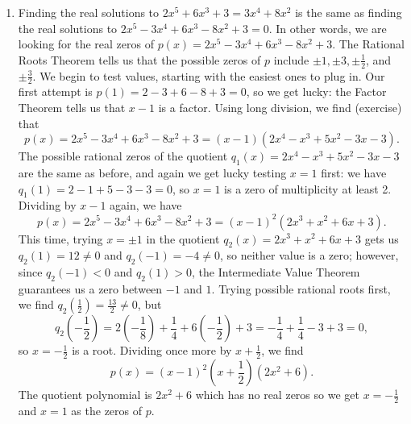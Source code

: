 {
\begin{enumerate}

\item  Finding the real solutions to $2x^5+6x^3+3 = 3x^4+8x^2$ is the same as finding the real solutions to $2x^5-3x^4+6x^3-8x^2+3=0$.  In other words, we are looking for the real zeros of $p(x)=  2x^5-3x^4+6x^3-8x^2+3$. 
{The Rational Roots Theorem tells us that the possible zeros of $p$ include $\pm 1, \pm 3, \pm \frac{1}{2}$, and $\pm \frac{3}{2}$. We begin to test values, starting with the easiest ones to plug in. Our first attempt is $p(1) = 2-3+6-8+3=0$, so we get lucky: the Factor Theorem tells us that $x-1$ is a factor. Using long division, we find (exercise) that
\[
p(x) = 2x^5-3x^4+6x^3-8x^2+3=(x-1)(2x^4-x^3+5x^2-3x-3).
\]
The possible rational zeros of the quotient $q_1(x) = 2x^4-x^3+5x^2-3x-3$ are the same as before, and again we get lucky testing $x=1$ first: we have $q_1(1)=2-1+5-3-3=0$, so $x=1$ is a zero of multiplicity at least 2. Dividing by $x-1$ again, we have
\[
p(x) = 2x^5-3x^4+6x^3-8x^2+3 = (x-1)^2(2x^3+x^2+6x+3).
\]
This time, trying $x=\pm 1$ in the quotient $q_2(x) = 2x^3+x^2+6x+3$ gets us $q_2(1) = 12\neq 0$ and $q_2(-1) = -4\neq 0$, so neither value is a zero; however, since $q_2(-1)<0$ and $q_2(1)>0$, the Intermediate Value Theorem guarantees us a zero between $-1$ and $1$. Trying possible rational roots first, we find $q_2\left(\frac{1}{2}\right)= \frac{13}{2}\neq 0$, but 
\[
q_2\left(-\frac{1}{2}\right) = 2\left(-\frac{1}{8}\right)+\frac{1}{4}+6\left(-\frac{1}{2}\right)+3 = -\frac{1}{4}+\frac{1}{4}-3+3=0,
\]
so $x=-\frac{1}{2}$ is a root. Dividing once more by $x+\frac{1}{2}$, we find
\[
p(x) = (x-1)^2\left(x+\frac{1}{2}\right)(2x^2+6).
\]
The quotient polynomial is $2x^2 + 6$ which has no real zeros so we get $x=-\frac{1}{2}$ and $x=1$ as the zeros of $p$.}


\end{enumerate}}
